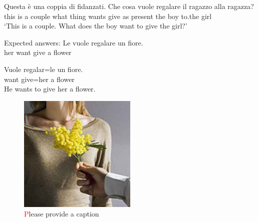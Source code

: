 \documentclass[output=paper,modfonts,nonflat,newtxmath]{langsci/langscibook}
\begin{document}
\ea
\gll Questa è una {coppia di fidanzati}. Che cosa vuole regalare il ragazzo alla ragazza?\\
this is a couple what thing wants {give as present}  the boy to.the girl\\
\glt `This is a couple. What does the boy want to give the girl?'
\z

\ea Expected answers:
\ea
\gll Le vuole regalare un fiore.\\
her want give a flower \\
\glt

\ex
\gll Vuole regalar=le un fiore.\\
want give=her a flower \\
\glt He wants to give her a flower.
\z
\z

\begin{figure}
\includegraphics[width=\textwidth]{figures/Sciutti-img001.png}
\caption{{\textcolor{red}Please provide a caption}}
\label{fig:sciutti:flowers}
\end{figure}

\end{document}
